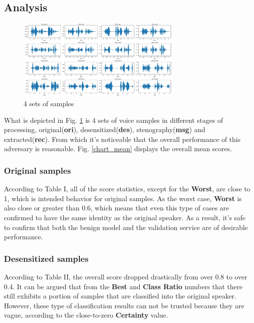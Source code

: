 \documentclass[journal]{IEEEtran} %
\begin{document}
\begin{CJK*}{UTF8}{gbsn}
\subsection{Analysis}

\begin{figure}[htbp]
    \centerline{\includegraphics[width=8cm]{samp_wav.jpg}}
    \caption{4 sets of samples}
    \label{samp1}
\end{figure}

What is depicted in Fig. \ref{samp1} is 4 sets of voice samples in different stages of processing, original(\textbf{ori}), desensitized(\textbf{des}), stenography(\textbf{msg}) and extracted(\textbf{rec}). From which it's noticeable that the overall performance of this adversary is reasonable. Fig. \ref{chart_mean} displays the overall mean scores.
\subsubsection{Original samples}

According to Table I, all of the score statistics, except for the \textbf{Worst}, are close to 1, which is intended behavior for original samples. As the worst case, \textbf{Worst} is also close or greater than 0.6, which means that even this type of cases are confirmed to have the same identity as the original speaker. As a result, it's safe to confirm that both the benign model and the validation service are of desirable performance.

\subsubsection{Desensitized samples}

According to Table II, the overall score dropped drastically from over 0.8 to over 0.4. It can be argued that from the \textbf{Best} and \textbf{Class Ratio} numbers that there still exhibits a portion of samples that are classified into the original speaker. However, these type of classification results can not be trusted because they are vague, according to the close-to-zero \textbf{Certainty} value.


\end{CJK*}
\end{document}

